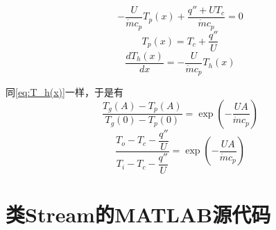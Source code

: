 \begin{equation}
-\frac{U}{\dot{m}c_{p}}T_{p}(x)+\frac{q''+UT_{c}}{\dot{m}c_{p}}=0
\end{equation}
\begin{equation}
T_{p}(x)=T_{c}+\frac{q''}{U}
\end{equation}
\begin{equation}
\frac{dT_{h}(x)}{dx}=-\frac{U}{\dot{m}c_{p}}T_{h}(x)
\end{equation}

同\autoref{eq:T_h(x)}一样，于是有
\begin{equation}
\frac{T_{g}(A)-T_{p}(A)}{T_{g}(0)-T_{p}(0)}=\exp(-\frac{UA}{\dot{m}c_{p}})
\end{equation}
\begin{equation}
\frac{T_{o}-T_{c}-\dfrac{q''}{U}}{T_{i}-T_{c}-\dfrac{q''}{U}}=\exp(-\frac{UA}{\dot{m}c_{p}})
\end{equation}

\chapter{类Stream的MATLAB源代码}
\label{cha:MATLAB_SOURCECODE}

